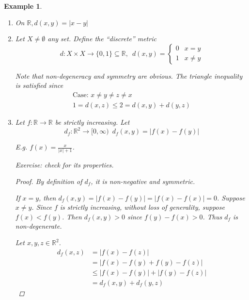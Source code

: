 \documentclass[11pt, oneside]{book}
\theoremstyle{break}
\newtheorem*{proof}{Proof}
\newtheorem{eg}{Example}[section]
\newcommand{\bb}[1]{\mathbb{#1}}			%
\begin{document}
\begin{eg}
	\begin{enumerate}
		\item On $\bb{R}, d(x,y) = |x - y|$
		\item Let $X \neq \emptyset$ any set. Define the ``discrete'' metric
			\begin{equation}
				d: X \times X \to \{0, 1\} \subseteq \bb{R}, \enspace d(x,y) =
					\begin{cases}
						0	&	x = y \\
						1	&	x \neq y
					\end{cases}
			\end{equation}

			Note that non-degeneracy and symmetry are obvious. The triangle inequality is satisfied since
			\begin{gather*}
				\text{Case: } x \neq y \neq z \neq x \\
				1 = d(x,z) \leq 2 = d(x,y) + d(y,z)
			\end{gather*}

		\item Let $f: \bb{R} \to \bb{R}$ be strictly increasing. Let
			\begin{equation}
				d_f: \bb{R}^2 \to [0, \infty) \enspace d_f(x,y) = |f(x) - f(y)|
			\end{equation}

			E.g. $f(x) = \frac{x}{|x| + 1}$.

			Exercise: check for its properties.
			\begin{tcolorbox}
				\begin{proof}
					By definition of $d_f$, it is non-negative and symmetric.

					If $x = y$, then $d_f(x, y) = |f(x) - f(y)| = |f(x) - f(x)| = 0$. Suppose $x \neq y$. Since $f$ is strictly increasing, without loss of generality, suppose $f(x) < f(y)$. Then $d_f(x, y) > 0$ since $f(y) - f(x) > 0$. Thus $d_f$ is non-degenerate.

					Let $x, y, z \in \bb{R}^2$.
					\begin{align*}
						d_f(x, z) &= |f(x) - f(z)| \\
							&= |f(x) - f(y) + f(y) - f(z)| \\
							&\leq |f(x) - f(y)| + |f(y) - f(z)| \\
							&= d_f(x, y) + d_f(y, z)
					\end{align*}
				\end{proof}
			\end{tcolorbox}


\end{enumerate}
\end{eg}
\end{document}
